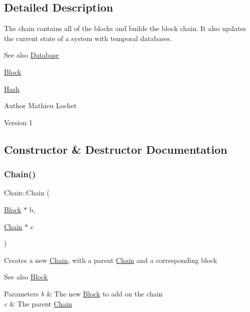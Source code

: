 \subsection{Detailed Description}
The chain contains all of the blocks and builds the block chain. It also updates the current state of a system with temporal databases. \begin{DoxySeeAlso}{See also}
\mbox{\hyperlink{classDatabase}{Database}} 

\mbox{\hyperlink{classBlock}{Block}} 

\mbox{\hyperlink{classHash}{Hash}}
\end{DoxySeeAlso}
\begin{DoxyAuthor}{Author}
Mathieu Lochet 
\end{DoxyAuthor}
\begin{DoxyVersion}{Version}
1 
\end{DoxyVersion}


\subsection{Constructor \& Destructor Documentation}
\mbox{\label{classChain_ae70c386f5d7b2e333419296545656907}} 
\subsubsection{\texorpdfstring{Chain()}{Chain()}\hspace{0.1cm}{\footnotesize\ttfamily [1/2]}}
{\footnotesize\ttfamily Chain\+::\+Chain (\begin{DoxyParamCaption}\item[{\mbox{\hyperlink{classBlock}{Block}} $\ast$}]{b,  }\item[{\mbox{\hyperlink{classChain}{Chain}} $\ast$}]{c }\end{DoxyParamCaption})}

Creates a new \mbox{\hyperlink{classChain}{Chain}}, with a parent \mbox{\hyperlink{classChain}{Chain}} and a corresponding block \begin{DoxySeeAlso}{See also}
\mbox{\hyperlink{classBlock}{Block}}
\end{DoxySeeAlso}

\begin{DoxyParams}{Parameters}
{\em b} & The new \mbox{\hyperlink{classBlock}{Block}} to add on the chain \\
\hline
{\em c} & The parent \mbox{\hyperlink{classChain}{Chain}} \\
\hline
\end{DoxyParams}
\mbox{\label{classChain_a97217102b89693d94c7c724cfcafa28f}} 
